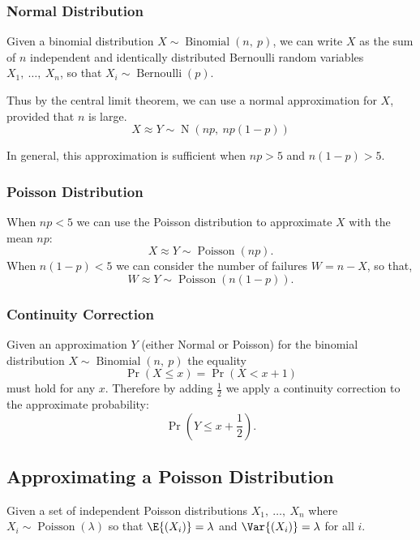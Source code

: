 \documentclass{article}
\begin{document}
\subsubsection{Normal Distribution}
Given a binomial distribution \(X \sim \operatorname{Binomial}{\left( n,\: p \right)}\), we can write \(X\)
as the sum of \(n\) independent and identically distributed Bernoulli random variables
\(X_1,\: \ldots,\: X_n\), so that \(X_i \sim \operatorname{Bernoulli}{\left( p \right)}\).

Thus by the central limit theorem, we can use a normal approximation for \(X\), provided that \(n\) is large.
\begin{equation*}
    X \approx Y \sim \operatorname{N}{\left( np,\: np\left( 1 - p \right) \right)}
\end{equation*}

In general, this approximation is sufficient when \(np > 5\) and \(n\left( 1 - p \right) > 5\).
\subsubsection{Poisson Distribution}
When \(np < 5\) we can use the Poisson distribution to approximate \(X\) with the mean \(np\):
\begin{equation*}
    X \approx Y \sim \operatorname{Poisson}{\left( np \right)}.
\end{equation*}
When \(n\left( 1 - p \right) < 5\) we can consider the number of failures \(W = n - X\), so that,
\begin{equation*}
    W \approx Y \sim \operatorname{Poisson}{\left( n\left( 1 - p \right) \right)}.
\end{equation*}
\subsubsection{Continuity Correction}
Given an approximation \(Y\) (either Normal or Poisson) for the binomial distribution \(X \sim \operatorname{Binomial}{\left( n,\: p \right)}\) the equality
\begin{equation*}
    \Pr{\left( X \leq x \right)} = \Pr{\left( X < x + 1 \right)}
\end{equation*}
must hold for any \(x\). Therefore by adding \(\frac{1}{2}\) we apply a continuity correction to the approximate probability:
\begin{equation*}
    \Pr{\left( Y \leq x + \frac{1}{2} \right)}.
\end{equation*}
\subsection{Approximating a Poisson Distribution}
Given a set of independent Poisson distributions \(X_1,\: \ldots ,\: X_n\) where \(X_i \sim \operatorname{Poisson}{\left( \lambda \right)}\)
so that \(\E{\left( X_i \right)} = \lambda\) and \(\Var{\left( X_i \right)} = \lambda\) for all \(i\).
\end{document}
